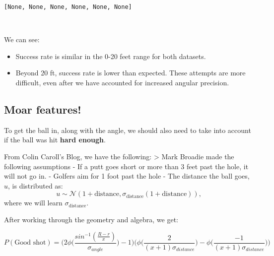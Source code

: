 \documentclass[11pt]{article}
\makeatletter
\providecommand{\tightlist}{%
      \setlength{\itemsep}{0pt}\setlength{\parskip}{0pt}}
\newcommand{\boxspacing}{\kern\kvtcb@left@rule\kern\kvtcb@boxsep}
\newcommand{\prompt}[4]{
        \ttfamily\llap{{\color{#2}[#3]:\hspace{3pt}#4}}\vspace{-\baselineskip}
    }
\makeatother
\begin{document}
            \begin{tcolorbox}[breakable, size=fbox, boxrule=.5pt, pad at break*=1mm, opacityfill=0]
\prompt{Out}{outcolor}{94}{\boxspacing}
\begin{Verbatim}[commandchars=\\\{\}]
[None, None, None, None, None, None]
\end{Verbatim}
\end{tcolorbox}
        
    \begin{center}
    \end{center}
    { \hspace*{\fill} \\}
    
    We can see:

\begin{itemize}
\tightlist
\item
  Success rate is similar in the 0-20 feet range for both datasets.
\item
  Beyond 20 ft, success rate is lower than expected. These attempts are
  more difficult, even after we have accounted for increased angular
  precision.
\end{itemize}

    \subsection{Moar features!}\label{moar-features}

    To get the ball in, along with the angle, we should also need to take
into account if the ball was hit \textbf{hard enough}.

From Colin Caroll's Blog, we have the following: \textgreater{} Mark
Broadie made the following assumptions - If a putt goes short or more
than 3 feet past the hole, it will not go in. - Golfers aim for 1 foot
past the hole - The distance the ball goes, \(u\), is distributed as:
\[ u \sim \mathcal{N}\left(1 + \text{distance}, \sigma_{\text{distance}} (1 + \text{distance})\right), \]
where we will learn \(\sigma_{\text{distance}}\).

After working through the geometry and algebra, we get:

\[P(\text{Good shot}) = \bigg(2\phi\big(\frac{sin^{-1}(\frac{R-r}{x})}{\sigma_{angle}}\big)-1\bigg)\bigg(\phi\bigg(\frac{2}{(x+1)\sigma_{distance}}\bigg) - \phi\bigg(\frac{-1}{(x+1)\sigma_{distance}}\bigg)\bigg)\]
\end{document}
